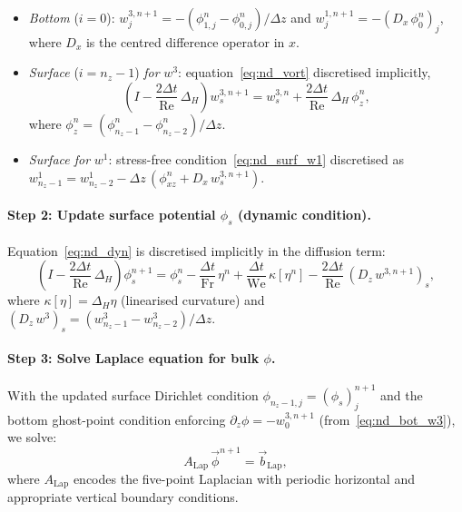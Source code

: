 \documentclass{article}
\newcommand{\Fr}{\mathrm{Fr}}
\newcommand{\We}{\mathrm{We}}
\newcommand{\Rey}{\mathrm{Re}}
\begin{document}
\begin{itemize}
    \item \emph{Bottom} ($i = 0$): $w^{3,n+1}_j = -(\phi^n_{1,j} - \phi^n_{0,j})/\Delta z$ and $w^{1,n+1}_j = -(D_x\,\phi^n_0)_j$, where $D_x$ is the centred difference operator in $x$.
    \item \emph{Surface} ($i = n_z - 1$) \emph{for} $w^3$: equation~\eqref{eq:nd_vort} discretised implicitly,
    \begin{equation}
        \left(I - \frac{2\Delta t}{\Rey}\,\Delta_H\right) w^{3,n+1}_s = w^{3,n}_s + \frac{2\Delta t}{\Rey}\,\Delta_H\,\phi_z^n, \label{eq:w3_surf_disc}
    \end{equation}
    where $\phi_z^n = (\phi^n_{n_z-1} - \phi^n_{n_z-2})/\Delta z$.
    \item \emph{Surface for} $w^1$: stress-free condition~\eqref{eq:nd_surf_w1} discretised as $w^1_{n_z-1} = w^1_{n_z-2} - \Delta z\,(\phi_{xz}^n + D_x\,w^{3,n+1}_s)$.
\end{itemize}

\paragraph{Step 2: Update surface potential $\phi_s$ (dynamic condition).}
Equation~\eqref{eq:nd_dyn} is discretised implicitly in the diffusion term:
\begin{equation}
    \left(I - \frac{2\Delta t}{\Rey}\,\Delta_H\right) \phi_s^{n+1} = \phi_s^n - \frac{\Delta t}{\Fr}\,\eta^n + \frac{\Delta t}{\We}\,\kappa[\eta^n] - \frac{2\Delta t}{\Rey}\,(D_z\,w^{3,n+1})_s,
    \label{eq:phi_s_disc}
\end{equation}
where $\kappa[\eta] = \Delta_H\eta$ (linearised curvature) and $(D_z\,w^3)_s = (w^3_{n_z-1} - w^3_{n_z-2})/\Delta z$.

\paragraph{Step 3: Solve Laplace equation for bulk $\phi$.}
With the updated surface Dirichlet condition $\phi_{n_z-1,j} = (\phi_s)_j^{n+1}$ and the bottom ghost-point condition enforcing $\partial_z\phi = -w^{3,n+1}_0$ (from~\eqref{eq:nd_bot_w3}), we solve:
\begin{equation}
    A_{\text{Lap}}\,\vec{\phi}^{n+1} = \vec{b}_{\text{Lap}}, \label{eq:laplace_disc}
\end{equation}
where $A_{\text{Lap}}$ encodes the five-point Laplacian with periodic horizontal and appropriate vertical boundary conditions.
\end{document}

